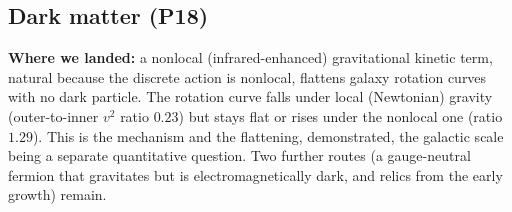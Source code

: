 \subsection{Dark matter (P18)}

\textbf{Where we landed:} a nonlocal (infrared-enhanced) gravitational kinetic term,
natural because the discrete action is nonlocal, flattens galaxy rotation curves with no
dark particle. The rotation curve falls under local (Newtonian) gravity (outer-to-inner
$v^2$ ratio $0.23$) but stays flat or rises under the nonlocal one (ratio $1.29$). This
is the mechanism and the flattening, demonstrated, the galactic scale being a separate
quantitative question. Two further routes (a gauge-neutral fermion that gravitates but
is electromagnetically dark, and relics from the early growth) remain.
